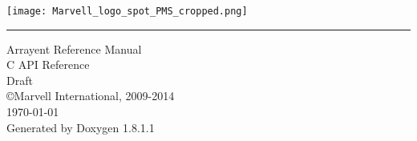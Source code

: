 \documentclass{book}
\newcommand{\TitleHRule}{\rule{\linewidth}{10pt}}
\begin{document}
\SetWatermarkFontSize{3cm}
\hypersetup{pageanchor=false,citecolor=blue}
\begin{titlepage}
\begin{minipage}[t]{\textwidth}
\raggedleft
\texttt{[image: Marvell\_logo\_spot\_PMS\_cropped.png]}
\end{minipage}
\vspace{.5cm}
\TitleHRule
\vspace{3.5cm}
\begin{flushleft}
{\Huge {\color{red} Arrayent Reference Manual}}\\
\vspace{1cm}
{\Large { C API Reference }}\\
\vspace{.75cm}
{{ Draft }}\\
\vspace{4cm}
{\Large \copyright \space Marvell International, 2009-2014}\\
\vspace{1cm}
{\small {\today \space \currenttime}}\\
{\small Generated by Doxygen 1.8.1.1}\\
\end{flushleft}
\end{titlepage}
\clearemptydoublepage
{}
\tableofcontents
\clearemptydoublepage
{}
\hypersetup{pageanchor=true,citecolor=blue}
\end{document}
